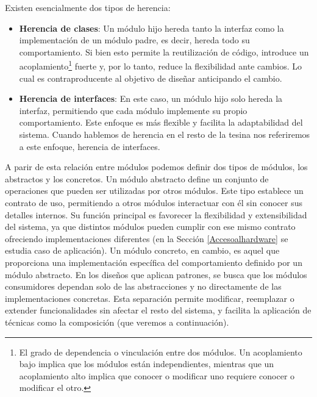 Existen esencialmente dos tipos de herencia:

\begin{itemize}
\item \textbf{Herencia de clases}: Un módulo hijo hereda tanto la interfaz como la implementación de un módulo padre, es decir, hereda todo su comportamiento. Si bien esto permite la reutilización de código, introduce un acoplamiento\footnote{El grado de dependencia o vinculación entre dos módulos. Un acoplamiento bajo implica que los módulos están independientes, mientras que un acoplamiento alto implica que conocer o modificar uno requiere conocer o modificar el otro.} fuerte y, por lo tanto, reduce la flexibilidad ante cambios. Lo cual es contraproducente al objetivo de diseñar anticipando el cambio.
\item \textbf{Herencia de interfaces}: En este caso, un módulo hijo solo hereda la interfaz, permitiendo que cada módulo implemente su propio comportamiento. Este enfoque es más flexible y facilita la adaptabilidad del sistema. Cuando hablemos de herencia en el resto de la tesina nos referiremos a este enfoque, herencia de interfaces.
\end{itemize}

A parir de esta relación entre módulos podemos definir dos tipos de módulos, los abstractos y los concretos. Un módulo abstracto define un conjunto de operaciones que pueden ser utilizadas por otros módulos. Este tipo establece un contrato de uso, permitiendo a otros módulos interactuar con él sin conocer sus detalles internos. Su función principal es favorecer la flexibilidad y extensibilidad del sistema, ya que distintos módulos pueden cumplir con ese mismo contrato ofreciendo implementaciones diferentes (en la Sección \ref{Accesoalhardware} se estudia caso de aplicación). Un módulo concreto, en cambio, es aquel que proporciona una implementación específica del comportamiento definido por un módulo abstracto. En los diseños que aplican patrones, se busca que los módulos consumidores dependan solo de las abstracciones y no directamente de las implementaciones concretas. Esta separación permite modificar, reemplazar o extender funcionalidades sin afectar el resto del sistema, y facilita la aplicación de técnicas como la composición (que veremos a continuación).

